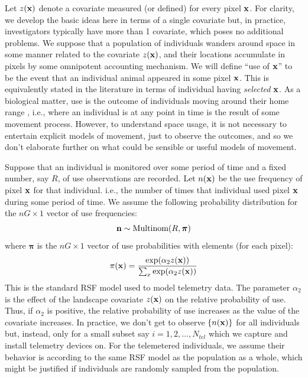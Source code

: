\documentclass[12pt]{article}
\begin{document}
Let $z({\bf x})$ denote a covariate measured (or defined) for every
pixel ${\bf x}$. For clarity, we develop the basic ideas here in terms of a
single covariate but, in practice, investigators typically have more
than 1 covariate, which poses no additional problems.
We suppose that a population of individuals wanders around space in
some manner related to the covariate $z({\bf x})$, and their locations
accumulate in pixels by some omnipotent accounting mechanism. We will
define ``use of ${\bf x}$'' to be the event that an individual animal
appeared in some pixel ${\bf x}$.
This is equivalently stated in the
literature in terms of individual having {\it selected} ${\bf  x}$.
 As a biological matter,
use is the outcome of individuals moving around their home range \citep{hooten_etal:2010},
i.e., where an individual is at any point in time is the result of
some movement process. However, to understand space usage, it is not
necessary to entertain explicit models of movement, just to observe
the outcomes, and so we don't elaborate further on what could be
sensible or useful models of movement.

Suppose that an individual  is monitored over some period of time
and a fixed number, say $R$, of use observations are recorded.
Let $n({\bf x})$ be the use frequency of pixel ${\bf x}$ for that individual.
i.e., the number of times that individual used pixel ${\bf x}$
during some period of time.
We assume the
following probability distribution for the $nG \times 1$ vector of use
frequencies:
\[
{\bf n} \sim \mbox{Multinom}(R, {\bm \pi})
\]
where ${\bm \pi}$ is the $nG \times 1$ vector of use probabilities
with elements (for each pixel):
\[
 \pi({\bf x}) = \frac{ \exp( \alpha_{2} z({\bf x}) ) }
   { \sum_{x}    \exp(\alpha_{2} z({\bf x})) }
\]
This is the standard RSF model \citep{manly_etal:2002} used to model
telemetry data.
The parameter $\alpha_2$ is the effect of the
landscape covariate $z({\bf x})$ on the relative probability of
use. Thus, if $\alpha_2$ is positive, the relative probability of use
increases as the value of the covariate increases.
In practice, we don't get to
observe $\{ n({\bf x}) \}$ for all individuals but, instead, only for a small
subset say $i=1,2,\ldots, N_{tel}$  which we capture and install telemetry devices on.
For the telemetered individuals, we assume their behavior is according
to the same RSF model as the population as a whole, which might be
justified if individuals are randomly sampled from the population.
\end{document}
